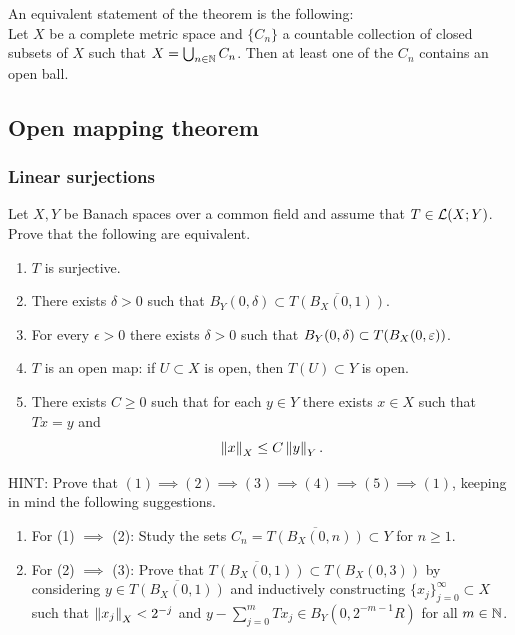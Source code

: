 \documentclass[a4paper]{article}
\begin{document}
\begin{remark}
    An equivalent statement of the theorem is the following: \\
    Let $X$ be a complete metric space and $\{C_n\}$ a countable
    collection of closed subsets of $X$ such that $X =
    \bigcup_{n \in \mathbb{N}} C_n $. Then at least one of the $C_n$
    contains an open ball.
\end{remark}

\subsection{Open mapping theorem}

\subsubsection*{Linear surjections}

\begin{thm}
Let $X,Y$ be Banach spaces over a common field and assume that
$T \in \mathcal{L}(X;Y)$.  Prove that the following are equivalent.
\begin{enumerate}
 \item $T$ is surjective.

 \item There exists $\delta >0$ such that $B_Y(0,\delta) \subset
 \overline{T(B_X(0,1))}$.

 \item For every $\epsilon >0$ there exists $\delta >0$
 such that $B_Y(0,\delta) \subset T(B_X(0,\varepsilon))$.

 \item $T$ is an open map: if $U\subset X$ is open, then
 $T(U) \subset Y$ is open.

  \item There exists $C \ge 0$ such that for each $y \in Y$
  there exists $x \in X$ such that $Tx=y$ and
\begin{equation*}
 \left\lVert x\right\rVert_X \leq C \left\lVert y\right\rVert_Y.
\end{equation*}
\end{enumerate}
HINT: Prove that  $(1) \implies (2) \implies (3)
\implies (4) \implies (5)  \implies (1)$, keeping
in mind the following suggestions.
\begin{enumerate}
 \item For (1) $\implies$ (2): Study the sets $C_n =
 \overline{T(B_X(0,n))} \subset Y$ for $n \ge 1$.
 \item For (2) $\implies$ (3):  Prove that
 $\overline{T(B_X(0,1)  )} \subset T(B_X(0,3))$
 by considering $y \in\overline{T(B_X(0,1)  )}$ and
 inductively constructing $\{x_j\}_{j=0}^\infty \subset X$
such that $\left\lVert x_j\right\rVert_X < 2^{-j}$ and
$y - \sum_{j=0}^m T x_j \in B_Y(0,2^{-m-1} R)$
for all $m \in \mathbb{N}$.
\end{enumerate}
\end{thm}
\end{document}
